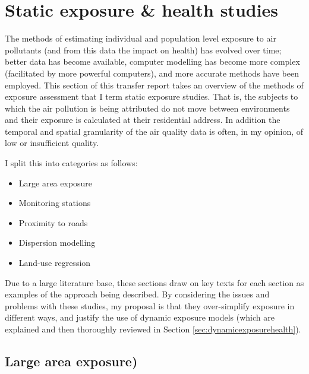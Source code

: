 \newpage

\section{Static exposure \& health studies}
\label{sec:staticexposurehealth}

The methods of estimating individual and population level exposure to air pollutants (and from this data the impact on health) has evolved over time; better data has become available, computer modelling has become more complex (facilitated by more powerful computers), and more accurate methods have been employed. This section of this transfer report takes an overview of the methods of exposure assessment that I term static exposure studies. That is, the subjects to which the air pollution is being attributed do not move between environments and their exposure is calculated at their residential address. In addition the temporal and spatial granularity of the air quality data is often, in my opinion, of low or insufficient quality.\hfill

I split this into categories as follows:

\begin{itemize}
\item Large area exposure
\item Monitoring stations
\item Proximity to roads
\item Dispersion modelling
\item Land-use regression
\end{itemize}

Due to a large literature base, these sections draw on key texts for each section as examples of the approach being described. By considering the issues and problems with these studies, my proposal is that they over-simplify exposure in different ways, and justify the use of dynamic exposure models (which are explained and then thoroughly reviewed in Section \ref{sec:dynamicexposurehealth}).\hfill


\subsection{Large area exposure)}
\label{subsec:largearea}

